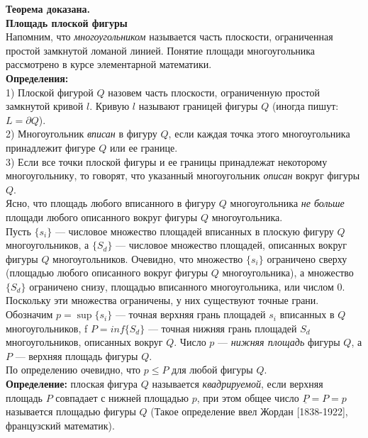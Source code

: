 \documentclass{article}
\begin{document}
  \textbf{Теорема доказана.}\\
  
  \huge\textbf{Площадь плоской фигуры}\normalsize\\
  
  Напомним, что \textit{многоугольником} называется часть плоскости, ограниченная простой замкнутой ломаной линией. Понятие площади многоугольника рассмотрено в курсе элементарной математики.\\
  
  \textbf{Определения:} \\
  
  1) Плоской фигурой $Q$ назовем часть плоскости, ограниченную простой замкнутой кривой $l$. Кривую $l$ называют границей фигуры $Q$ (иногда пишут: $L=\partial Q$). \\
  
  2) Многоугольник \textit{вписан} в фигуру $Q$, если каждая точка этого многоугольника принадлежит фигуре $Q$ или ее границе.\\
  
  3) Если все точки плоской фигуры и ее границы принадлежат некоторому многоугольнику, то говорят, что указанный многоугольник \textit{описан} вокруг фигуры $Q$.\\
  
  Ясно, что площадь любого вписанного в фигуру $Q$ многоугольника \textit{не больше} площади любого описанного вокруг фигуры $Q$ многоугольника.\\
  
  Пусть $\{s_i\}$ --- числовое множество площадей вписанных в плоскую фигуру $Q$ многоугольников, а $\{S_d\}$ --- числовое множество площадей, описанных вокруг фигуры $Q$ многоугольников. Очевидно, что множество $\{s_i\}$ ограничено сверху (площадью любого описанного вокруг фигуры $Q$ многоугольника), а множество $\{S_d\}$ ограничено снизу, площадью вписанного многоугольника, или числом $0$. Поскольку эти множества ограничены, у них существуют точные грани. Обозначим $p=\sup \{s_i\}$ --- точная верхняя грань площадей $s_i$ вписанных в $Q$ многоугольников, f $P=inf\{S_d\}$ --- точная нижняя грань площадей $S_d$ многоугольников, описанных вокруг $Q$. Число $p$ --- \textit{нижняя площадь} фигуры $Q$, а $P$ --- верхняя площадь фигуры $Q$.\\
  
  По определению очевидно, что $p\leq P$ для любой фигуры $Q$.\\
  
  \textbf{Определение:} плоская фигура $Q$ называется \textit{квадрируемой}, если верхняя площадь $P$ совпадает с нижней площадью $p$, при этом общее число $\underline P=P=p$ называется площадью фигуры $Q$ (Такое определение ввел Жордан [1838-1922], французский математик).\\
  
\end{document}
